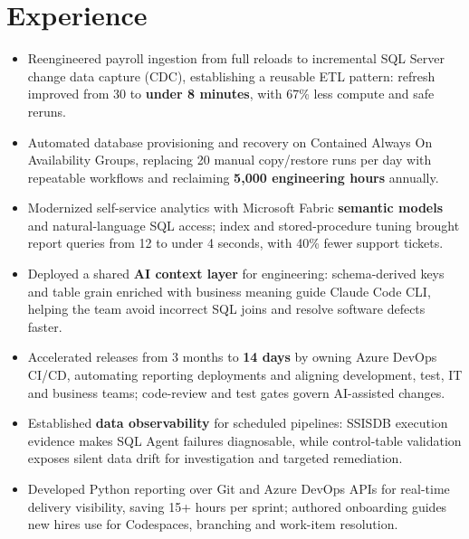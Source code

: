 \documentclass[letterpaper,10pt]{article}
\begin{document}
\section{Experience}
\begin{itemize}
\item Reengineered payroll ingestion from full reloads to incremental SQL Server change data capture (CDC), establishing a reusable ETL pattern: refresh improved from 30 to \textbf{under 8 minutes}, with 67\% less compute and safe reruns.
\item Automated database provisioning and recovery on Contained Always On Availability Groups, replacing 20 manual copy/restore runs per day with repeatable work\mbox{f}lows and reclaiming \textbf{5,000 engineering hours} annually.
\item Modernized self-service analytics with Microsoft Fabric \textbf{semantic models} and natural-language SQL access; index and stored-procedure tuning brought report queries from 12 to under 4 seconds, with 40\% fewer support tickets.
\item Deployed a shared \textbf{AI context layer} for engineering: schema-derived keys and table grain enriched with business meaning guide Claude Code CLI, helping the team avoid incorrect SQL joins and resolve software defects faster.
\item Accelerated releases from 3 months to \textbf{14 days} by owning Azure DevOps CI/CD, automating reporting deployments and aligning development, test, IT and business teams; code-review and test gates govern AI-assisted changes.
\item Established \textbf{data observability} for scheduled pipelines: SSISDB execution evidence makes SQL Agent failures diagnosable, while control-table validation exposes silent data drift for investigation and targeted remediation.
\item Developed Python reporting over Git and Azure DevOps APIs for real-time delivery visibility, saving 15+ hours per sprint; authored onboarding guides new hires use for Codespaces, branching and work-item resolution.
\end{itemize}
\end{document}
